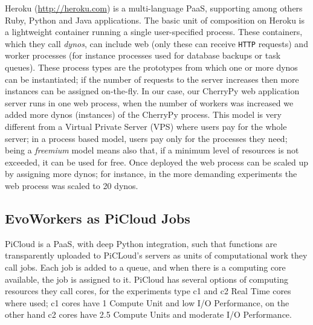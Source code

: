 Heroku (\url{http://heroku.com}) is a multi-language PaaS, supporting among others Ruby, Python and Java applications. The basic unit of composition on
Heroku is a lightweight container running a single user-specified
process. These containers, which they call {\em dynos}, can include web
(only these can receive {\tt HTTP} requests) and worker processes
(for instance processes used for database backups or task queues).
These  process types are the prototypes from which one or more dynos 
can be instantiated; if the number of requests to the server increases then 
more instances can be assigned on-the-fly. In our case, our CherryPy 
web application server runs in one web process, when the number 
of workers was increased we added more dynos (instances) of the 
CherryPy process. This model is very different from a Virtual Private Server (VPS) where users pay for the whole server; in a process based model, users pay only for the processes they need; being a {\em freemium} model means also that, if a minimum level of resources is not exceeded, it can be used for
free. 
Once deployed the web process can be scaled up by assigning more dynos;
for instance, in the more demanding experiments the web process was scaled to 20 dynos.


\subsection{EvoWorkers as PiCloud Jobs}
PiCloud is a PaaS, with deep Python integration, such that functions are transparently uploaded to PiCLoud's 
servers as units of computational work they call jobs. 
Each job is added to a queue, and when there is a computing core available, 
the job is assigned to it. PiCloud has several options of computing resources they call cores,
for the experiments type c1 and c2 Real Time cores where used; c1 cores have 1 Compute Unit and low I/O Performance,
on the other hand c2 cores have 2.5 Compute Units and moderate I/O Performance.




